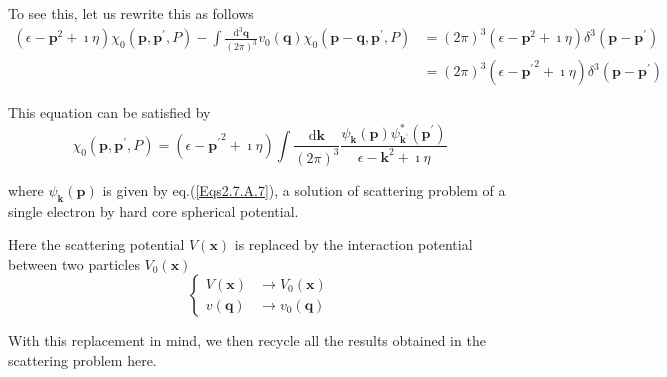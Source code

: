 To see this, let us rewrite this as follows
\begin{equation*} \label{Eqs2.7.18''} \tag{2.7.18''}
\begin{split}
(\epsilon-\mathbf{p}^2+\imath\eta)\chi_0(\mathbf{p},\mathbf{p}^{'},P) - \int\frac{\mathrm{d}^3\mathbf{q}}{(2\pi)^3}v_0(\mathbf{q}) \chi_0(\mathbf{p}-\mathbf{q},\mathbf{p}^{'},P)
&=(2\pi)^3 (\epsilon-\mathbf{p}^2+\imath\eta) \delta^3(\mathbf{p}-\mathbf{p}^{'})\\
&=(2\pi)^3 (\epsilon-{\mathbf{p}^{'}}^2+\imath\eta) \delta^3(\mathbf{p}-\mathbf{p}^{'})\end{split}
\end{equation*}

This equation can be satisfied by
\begin{equation} \label{Eqs2.7.20}
\chi_0(\mathbf{p},\mathbf{p}^{'},P) = (\epsilon - {\mathbf{p}^{'}}^2 + \imath \eta) \int \frac{\mathrm{d}\mathbf{k}}{(2\pi)^3} \frac{\psi_{\mathbf{k}}(\mathbf{p})\psi_{\mathbf{k}^{'}}^{*} (\mathbf{p}^{'})}{\epsilon - \mathbf{k}^2 + \imath \eta}
\end{equation}

where $\psi_{\mathbf{k}}(\mathbf{p})$ is given by eq.(\ref{Eqs2.7.A.7}), a solution of scattering problem of a single electron by hard core spherical potential.

Here the scattering potential $V(\mathbf{x})$ is replaced by the interaction potential between two particles $V_0(\mathbf{x})$
\begin{equation} \label{Eqs2.7.21}
\left\{ \begin{split} V(\mathbf{x}) &\rightarrow V_0(\mathbf{x})\\ v(\mathbf{q}) &\rightarrow v_0(\mathbf{q})
\end{split} \right.
\end{equation}

With this replacement in mind, we then recycle all the results obtained in the scattering problem here.

